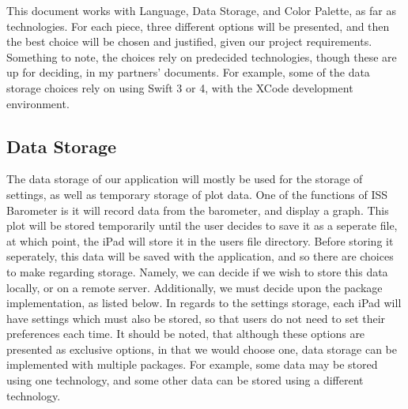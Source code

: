 \documentclass[onecolumn, draftclsnofoot,10pt, compsoc]{IEEEtran}
\begin{document}
This document works with Language, Data Storage, and Color Palette, as far as technologies.
For each piece, three different options will be presented, and then the best choice will be chosen and justified, given our project requirements.
Something to note, the choices rely on predecided technologies, though these are up for deciding, in my partners' documents.
For example, some of the data storage choices rely on using Swift 3 or 4, with the XCode development environment.

\subsection{Data Storage}
The data storage of our application will mostly be used for the storage of settings, as well as temporary storage of plot data.
One of the functions of ISS Barometer is it will record data from the barometer, and display a graph.
This plot will be stored temporarily until the user decides to save it as a seperate file, at which point, the iPad will store it in the users file directory.
Before storing it seperately, this data will be saved with the application, and so there are choices to make regarding storage.
Namely, we can decide if we wish to store this data locally, or on a remote server.
Additionally, we must decide upon the package implementation, as listed below.
In regards to the settings storage, each iPad will have settings which must also be stored, so that users do not need to set their preferences each time.
It should be noted, that although these options are presented as exclusive options, in that we would choose one, data storage can be implemented with multiple packages.
For example, some data may be stored using one technology, and some other data can be stored using a different technology.
\end{document}
